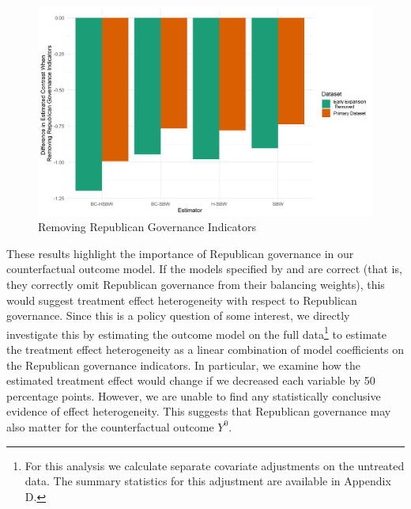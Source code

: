\begin{figure}[H]
\begin{center}
    \caption{Removing Republican Governance Indicators}
    \label{fig:repub}
    \includegraphics[scale=0.6]{01_Plots/repub-diff-c1c2.png}
\end{center}
\end{figure}

These results highlight the importance of Republican governance in our counterfactual outcome model. If the models specified by \cite{kaestner2017effects} and \cite{courtemanche2017early} are correct (that is, they correctly omit Republican governance from their balancing weights), this would suggest treatment effect heterogeneity with respect to Republican governance. Since this is a policy question of some interest, we directly investigate this by estimating the outcome model on the full data\footnote{For this analysis we calculate separate covariate adjustments on the untreated data. The summary statistics for this adjustment are available in Appendix D.} to estimate the treatment effect heterogeneity as a linear combination of model coefficients on the Republican governance indicators. In particular, we examine how the estimated treatment effect would change if we decreased each variable by 50 percentage points. However, we are unable to find any statistically conclusive evidence of effect heterogeneity. This suggests that Republican governance may also matter for the counterfactual outcome $Y^0$. 